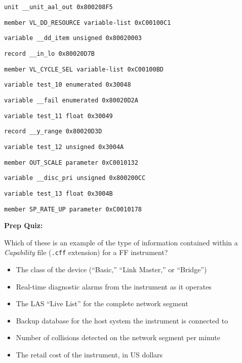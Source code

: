 {\tt unit            \_\_unit\_aal\_out                            0x800208F5 }

{\tt member          VL\_DD\_RESOURCE            variable-list   0xC00100C1 }

{\tt variable        \_\_dd\_item                 unsigned        0x80020003 }

{\tt record          \_\_in\_lo                                   0x80020D7B }

{\tt member          VL\_CYCLE\_SEL              variable-list   0xC00100BD }

{\tt variable        test\_10                   enumerated      0x30048 }

{\tt variable        \_\_fail                    enumerated      0x80020D2A }

{\tt variable        test\_11                   float           0x30049 }

{\tt record          \_\_y\_range                                 0x80020D3D }

{\tt variable        test\_12                   unsigned        0x3004A }

{\tt member          OUT\_SCALE                 parameter       0xC0010132 }

{\tt variable        \_\_disc\_pri                unsigned        0x800200CC }

{\tt variable        test\_13                   float           0x3004B }

{\tt member          SP\_RATE\_UP                parameter       0xC0010178 }














\vfil \eject

\noindent
{\bf Prep Quiz:}

Which of these is an example of the type of information contained within a {\it Capability } file ({\tt .cff} extension) for a FF instrument?

\begin{itemize}
\item{} The class of the device (``Basic,'' ``Link Master,'' or ``Bridge'')
\vskip 5pt 
\item{} Real-time diagnostic alarms from the instrument as it operates
\vskip 5pt 
\item{} The LAS ``Live List'' for the complete network segment
\vskip 5pt 
\item{} Backup database for the host system the instrument is connected to
\vskip 5pt 
\item{} Number of collisions detected on the network segment per minute 
\vskip 5pt 
\item{} The retail cost of the instrument, in US dollars
\end{itemize}














